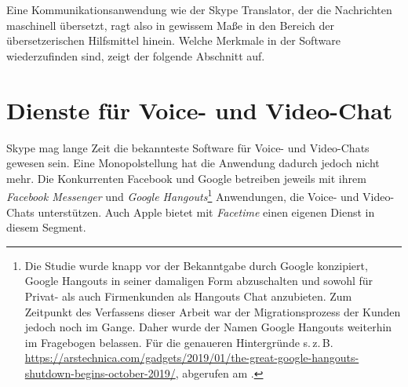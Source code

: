 Eine Kommunikationsanwendung wie der Skype Translator, der die Nachrichten maschinell übersetzt, ragt also in gewissem Maße in den Bereich der übersetzerischen Hilfsmittel hinein. Welche Merkmale in der Software wiederzufinden sind, zeigt der folgende Abschnitt auf. 


\section{Dienste für Voice- und Video-Chat}

\label{K3:sec:Dienste}




Skype mag lange Zeit die bekannteste Software für Voice- und Video-Chats gewesen sein. Eine Monopolstellung hat die Anwendung dadurch jedoch nicht mehr. Die Konkurrenten Facebook und Google betreiben jeweils mit ihrem \emph{Facebook Messenger} und \emph{Google Hangouts}\footnote{Die Studie wurde knapp vor der Bekanntgabe durch Google konzipiert, Google Hangouts in seiner damaligen Form abzuschalten und sowohl für Privat- als auch Firmenkunden als \glqq Hangouts Chat\grqq{} anzubieten. Zum Zeitpunkt des Verfassens dieser Arbeit war der Migrationsprozess der Kunden jedoch noch im Gange. Daher wurde der Namen \glqq Google Hangouts\grqq{} weiterhin im Fragebogen belassen. Für die genaueren Hintergründe s.\,z.\,B. \url{https://arstechnica.com/gadgets/2019/01/the-great-google-hangouts-shutdown-begins-october-2019/}, abgerufen am \datum{}.} Anwendungen, die Voice- und Video-Chats unterstützen. Auch Apple bietet mit \emph{Facetime} einen eigenen Dienst in diesem Segment.

